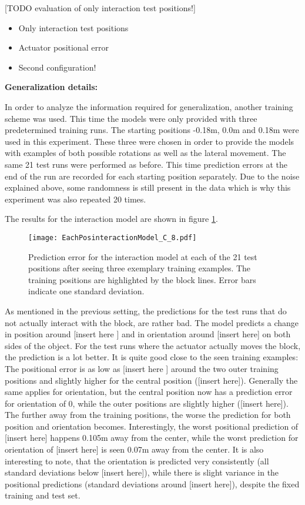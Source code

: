 [TODO evaluation of only interaction test positions!]
\begin{itemize}
\item Only interaction test positions
\item Actuator positional error
\item Second configuration!
\end{itemize}

\textbf{Generalization details:}

In order to analyze the information required for generalization, another training scheme was used. This time the models were only provided with three predetermined training runs. The starting positions -0.18m, 0.0m and 0.18m were used in this experiment. These three were chosen in order to provide the models with examples of both possible rotations as well as the lateral movement. The same 21 test runs were performed as before. This time prediction errors at the end of the run are recorded for each starting position separately. Due to the noise explained above, some randomness is still present in the data which is why this experiment was also repeated 20 times. 

The results for the interaction model are shown in figure \ref{fig:eachPosInteraction}.

\begin{figure}
\centering
\texttt{[image: EachPosinteractionModel\_C\_8.pdf]}
\caption{Prediction error for the interaction model at each of the 21 test positions after seeing three exemplary training examples. The training positions are highlighted by the block lines. Error bars indicate one standard deviation.}
\label{fig:eachPosInteraction}
\end{figure}

As mentioned in the previous setting, the predictions for the test runs that do not actually interact with the block, are rather bad. The model predicts a change in position around [insert here ] and in orientation around [insert here] on both sides of the object. 
For the test runs where the actuator actually moves the block, the prediction is a lot better. It is quite good close to the seen training examples: The positional error is as low as [insert here ] around the two outer training positions and slightly higher for the central position ([insert here]). Generally the same applies for orientation, but the central position now has a prediction error for orientation of 0, while the outer positions are slightly higher ([insert here]).
The further away from the training positions, the worse the prediction for both position and orientation becomes. Interestingly, the worst positional prediction of [insert here] happens 0.105m away from the center, while the worst prediction for orientation of [insert here] is seen 0.07m away from the center.
It is also interesting to note, that the orientation is predicted very consistently (all standard deviations below [insert here]), while there is slight variance in the positional predictions (standard deviations around [insert here]), despite the fixed training and test set.

